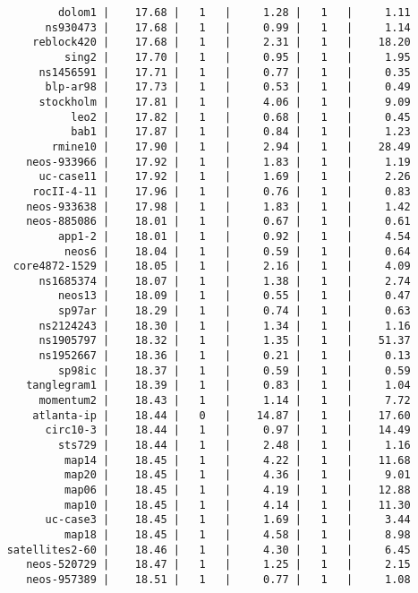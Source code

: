 \begin{verbatim}
            dolom1 |    17.68 |   1   |     1.28 |   1   |     1.11
          ns930473 |    17.68 |   1   |     0.99 |   1   |     1.14
        reblock420 |    17.68 |   1   |     2.31 |   1   |    18.20
             sing2 |    17.70 |   1   |     0.95 |   1   |     1.95
         ns1456591 |    17.71 |   1   |     0.77 |   1   |     0.35
          blp-ar98 |    17.73 |   1   |     0.53 |   1   |     0.49
         stockholm |    17.81 |   1   |     4.06 |   1   |     9.09
              leo2 |    17.82 |   1   |     0.68 |   1   |     0.45
              bab1 |    17.87 |   1   |     0.84 |   1   |     1.23
           rmine10 |    17.90 |   1   |     2.94 |   1   |    28.49
       neos-933966 |    17.92 |   1   |     1.83 |   1   |     1.19
         uc-case11 |    17.92 |   1   |     1.69 |   1   |     2.26
        rocII-4-11 |    17.96 |   1   |     0.76 |   1   |     0.83
       neos-933638 |    17.98 |   1   |     1.83 |   1   |     1.42
       neos-885086 |    18.01 |   1   |     0.67 |   1   |     0.61
            app1-2 |    18.01 |   1   |     0.92 |   1   |     4.54
             neos6 |    18.04 |   1   |     0.59 |   1   |     0.64
     core4872-1529 |    18.05 |   1   |     2.16 |   1   |     4.09
         ns1685374 |    18.07 |   1   |     1.38 |   1   |     2.74
            neos13 |    18.09 |   1   |     0.55 |   1   |     0.47
            sp97ar |    18.29 |   1   |     0.74 |   1   |     0.63
         ns2124243 |    18.30 |   1   |     1.34 |   1   |     1.16
         ns1905797 |    18.32 |   1   |     1.35 |   1   |    51.37
         ns1952667 |    18.36 |   1   |     0.21 |   1   |     0.13
            sp98ic |    18.37 |   1   |     0.59 |   1   |     0.59
       tanglegram1 |    18.39 |   1   |     0.83 |   1   |     1.04
         momentum2 |    18.43 |   1   |     1.14 |   1   |     7.72
        atlanta-ip |    18.44 |   0   |    14.87 |   1   |    17.60
          circ10-3 |    18.44 |   1   |     0.97 |   1   |    14.49
            sts729 |    18.44 |   1   |     2.48 |   1   |     1.16
             map14 |    18.45 |   1   |     4.22 |   1   |    11.68
             map20 |    18.45 |   1   |     4.36 |   1   |     9.01
             map06 |    18.45 |   1   |     4.19 |   1   |    12.88
             map10 |    18.45 |   1   |     4.14 |   1   |    11.30
          uc-case3 |    18.45 |   1   |     1.69 |   1   |     3.44
             map18 |    18.45 |   1   |     4.58 |   1   |     8.98
    satellites2-60 |    18.46 |   1   |     4.30 |   1   |     6.45
       neos-520729 |    18.47 |   1   |     1.25 |   1   |     2.15
       neos-957389 |    18.51 |   1   |     0.77 |   1   |     1.08

\end{verbatim}
